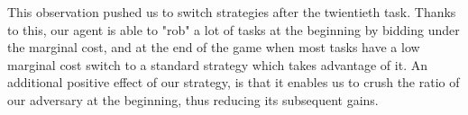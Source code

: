 \documentclass[11pt]{article}
\begin{document}
This observation pushed us to switch strategies after the twientieth task. Thanks to this, our agent is able to "rob" a lot of tasks at the beginning by bidding under the marginal cost, and at the end of the game when most tasks have a low marginal cost switch to a standard strategy which takes advantage of it. An additional positive effect of our strategy, is that it enables us to crush the ratio of our adversary at the beginning, thus reducing its subsequent gains.
\end{document}
